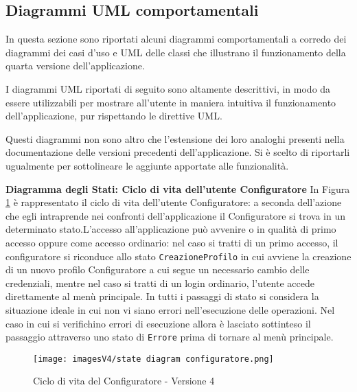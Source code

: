 \newpage
\subsection{Diagrammi UML comportamentali}
In questa sezione sono riportati alcuni diagrammi comportamentali a corredo dei diagrammi dei casi d'uso e UML delle classi che illustrano il funzionamento della quarta versione dell'applicazione.

I diagrammi UML riportati di seguito sono altamente descrittivi, in modo da essere utilizzabili per mostrare all'utente in maniera intuitiva il funzionamento dell'applicazione, pur rispettando le direttive UML.

Questi diagrammi non sono altro che l'estensione dei loro analoghi presenti nella documentazione delle versioni precedenti dell'applicazione. Si è scelto di riportarli ugualmente per sottolineare le aggiunte apportate alle funzionalità.\bigskip

\textbf{Diagramma degli Stati: Ciclo di vita dell'utente Configuratore}\newline
In Figura \ref{fig:State diagram 4.1} è rappresentato il ciclo di vita dell'utente Configuratore: a seconda dell'azione che egli intraprende nei confronti dell'applicazione il Configuratore si trova in un determinato stato.\newline L'accesso all'applicazione può avvenire o in qualità di primo accesso oppure come accesso ordinario: nel caso si tratti di un primo accesso, il configuratore si riconduce allo stato \texttt{CreazioneProfilo} in cui avviene la creazione di un nuovo profilo Configuratore a cui segue un necessario cambio delle credenziali, mentre nel caso si tratti di un login ordinario, l'utente accede direttamente al menù principale. \newline 
In tutti i passaggi di stato si considera la situazione ideale in cui non vi siano errori nell'esecuzione delle operazioni. Nel caso in cui si verifichino errori di esecuzione allora è lasciato sottinteso il passaggio attraverso uno stato di \texttt{Errore} prima di tornare al menù principale.

\begin{figure}[h]
\centering
\texttt{[image: imagesV4/state diagram configuratore.png]}
\caption{\label{fig:State diagram 4.1}Ciclo di vita del Configuratore - Versione 4}
\end{figure}\bigskip

